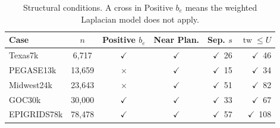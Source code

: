 \begin{table}[t]
\caption{Structural conditions. A cross in Positive $b_e$ means the weighted Laplacian model does not apply.}
\label{tab:conditions}
\centering
\setlength{\tabcolsep}{2.2pt}
\begin{tabular}{lcccrr}
\hline
Case & $n$ & Positive $b_e$ & Near Plan. & Sep. $s$ & $\operatorname{tw}\leq U$ \\
\hline
Texas7k & 6,717 & $\checkmark$ & $\checkmark$ & $\checkmark$~26 & $\checkmark$~46 \\
PEGASE13k & 13,659 & $\times$ & $\checkmark$ & $\checkmark$~15 & $\checkmark$~34 \\
Midwest24k & 23,643 & $\times$ & $\checkmark$ & $\checkmark$~51 & $\checkmark$~82 \\
GOC30k & 30,000 & $\checkmark$ & $\checkmark$ & $\checkmark$~33 & $\checkmark$~67 \\
EPIGRIDS78k & 78,478 & $\checkmark$ & $\checkmark$ & $\checkmark$~57 & $\checkmark$~108 \\
\hline
\end{tabular}
\end{table}
